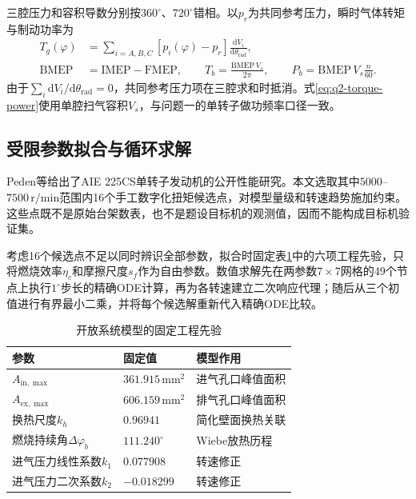 \documentclass[withoutpreface,bwprint]{cumcmthesis}
\begin{document}
三腔压力和容积导数分别按$360^\circ$、$720^\circ$错相。以$p_r$为共同参考压力，瞬时气体转矩与制动功率为
\begin{align}
 T_g(\varphi)&=\sum_{i=A,B,C}[p_i(\varphi)-p_r]
 \frac{\mathrm dV_i}{\mathrm d\theta_{\mathrm{rad}}},\nonumber\\
 \mathrm{BMEP}&=\mathrm{IMEP}-\mathrm{FMEP},\qquad
 T_b=\frac{\mathrm{BMEP}\,V_s}{2\pi},\qquad
 P_b=\mathrm{BMEP}\,V_s\frac{n}{60}.
 \label{eq:q2-torque-power}
\end{align}
由于$\sum_i\mathrm dV_i/\mathrm d\theta_{\mathrm{rad}}=0$，共同参考压力项在三腔求和时抵消。式\eqref{eq:q2-torque-power}使用单腔扫气容积$V_s$，与问题一的单转子做功频率口径一致。

\subsection{受限参数拟合与循环求解}

Peden等给出了AIE 225CS单转子发动机的公开性能研究\cite{peden2018wankel}。本文选取其中$5000$--$7500\,\mathrm{r/min}$范围内16个手工数字化扭矩候选点，对模型量级和转速趋势施加约束。这些点既不是原始台架数表，也不是题设目标机的观测值，因而不能构成目标机验证集。

考虑16个候选点不足以同时辨识全部参数，拟合时固定表\ref{tab:q2-fixed-priors}中的六项工程先验，只将燃烧效率$\eta_c$和摩擦尺度$s_f$作为自由参数。数值求解先在两参数$7\times7$网格的49个节点上执行$1^\circ$步长的精确ODE计算，再为各转速建立二次响应代理；随后从三个初值进行有界最小二乘，并将每个候选解重新代入精确ODE比较。

\begin{table}[H]
\centering
\caption{开放系统模型的固定工程先验}
\label{tab:q2-fixed-priors}
\begin{tabular}{lll}
\toprule
参数 & 固定值 & 模型作用\\
\midrule
$A_{\mathrm{in},\max}$ & $361.915\,\mathrm{mm^2}$ & 进气孔口峰值面积\\
$A_{\mathrm{ex},\max}$ & $606.159\,\mathrm{mm^2}$ & 排气孔口峰值面积\\
换热尺度$k_h$ & $0.96941$ & 简化壁面换热关联\\
燃烧持续角$\Delta\varphi_b$ & $111.240^\circ$ & Wiebe放热历程\\
进气压力线性系数$k_1$ & $0.077908$ & 转速修正\\
进气压力二次系数$k_2$ & $-0.018299$ & 转速修正\\
\bottomrule
\end{tabular}
\end{table}
\end{document}
